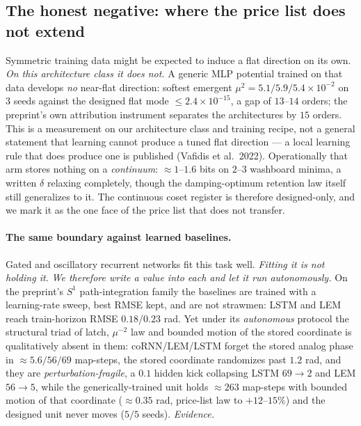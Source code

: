 \documentclass{article}
\begin{document}
\subsection{The honest negative: where the price list does not extend}\label{sec:boundary}

Symmetric training data might be expected to induce a flat direction on its own. \emph{On this architecture class it does not.} A generic MLP potential trained on that data develops \emph{no} near-flat direction: softest emergent $\mu^2=5.1/5.9/5.4\!\times\!10^{-2}$ on $3$ seeds against the designed flat mode $\le2.4\!\times\!10^{-15}$, a gap of $13$--$14$ orders; the preprint's own attribution instrument separates the architectures by $15$ orders. This is a measurement on our architecture class and training recipe, not a general statement that learning cannot produce a tuned flat direction --- a local learning rule that does produce one is published (Vafidis et al.\ 2022). Operationally that arm stores nothing on a \emph{continuum}: $\approx1$--$1.6$ bits on $2$--$3$ washboard minima, a written $\delta$ relaxing completely, though the damping-optimum retention law itself still generalizes to it. The continuous coset register is therefore designed-only, and we mark it as the one face of the price list that does not transfer.

\paragraph{The same boundary against learned baselines.} Gated and oscillatory recurrent networks fit this task well. \emph{Fitting it is not holding it.} \emph{We therefore write a value into each and let it run autonomously.} On the preprint's $S^1$ path-integration family the baselines are trained with a learning-rate sweep, best RMSE kept, and are not strawmen: LSTM and LEM reach train-horizon RMSE $0.18$/$0.23$ rad. Yet under its \emph{autonomous} protocol the structural triad of latch, $\mu^{-2}$ law and bounded motion of the stored coordinate is qualitatively absent in them: coRNN/LEM/LSTM forget the stored analog phase in $\approx5.6/56/69$ map-steps, the stored coordinate randomizes past $1.2$ rad, and they are \emph{perturbation-fragile}, a $0.1$ hidden kick collapsing LSTM $69\to2$ and LEM $56\to5$, while the generically-trained unit holds $\approx263$ map-steps with bounded motion of that coordinate ($\approx0.35$ rad, price-list law to $+12$--$15\%$) and the designed unit never moves ($5/5$ seeds). \emph{Evidence.}
\end{document}
